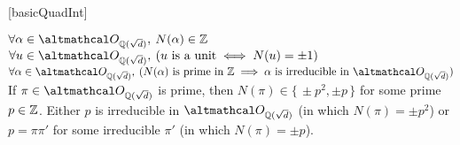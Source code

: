\documentclass[../modern_algebra_2.tex]{subfiles}
\begin{document}
\begin{Theorem}{}[basicQuadInt]
    \begin{enumerate}[label=(\roman*), ref=\protect{\Cref{th:basicQuadInt} (\roman*)}, listparindent=\parindent]
        \ii\label{itm:basicQuadInt.i}
        \(\fall \alpha \in \mcal{O}_{\QQ(\sqrt{d})},\: N(\alpha) \in \ZZ\)
        \ii\label{itm:basicQuadInt.ii}
        \(\fall u \in \mcal{O}_{\QQ(\sqrt{d})},\: (u~\text{is a unit} \iff N(u) = \pm 1)\)
        \ii\label{itm:basicQuadInt.iii}
        \(\fall \alpha \in \mcal{O}_{\QQ(\sqrt{d})},\:
        (N(\alpha)~\text{is prime in}~\ZZ \implies \alpha~\text{is irreducible in}~\mcal{O}_{\QQ(\sqrt{d})})\)
        \ii\label{itm:basicQuadInt.iv}
        If \(\pi \in \mcal{O}_{\QQ(\sqrt{d})}\) is prime,
        then \(N(\pi) \in \{\,\pm p^2, \pm p\,\}\) for some prime \(p \in \ZZ\).
        Either \(p\) is irreducible in \(\mcal{O}_{\QQ(\sqrt{d})}\) (in which \(N(\pi) = \pm p^2\))
        or \(p = \pi \pi'\) for some irreducible \(\pi'\) (in which \(N(\pi) = \pm p\)).
    \end{enumerate}
\end{Theorem}
\end{document}
